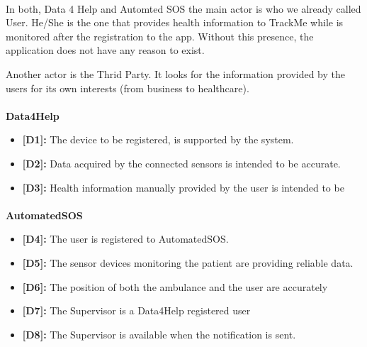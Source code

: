 \paragraph{}
{}

In both, Data 4 Help and Automted SOS the main actor is who we already called User. He/She is the one that provides health information to TrackMe while is monitored after the registration to the app. Without this presence, the application does not have any reason to exist.

Another actor is the Thrid Party. It looks for the information provided by the users for its own interests (from business to healthcare).
\paragraph{}

{}
{}
\paragraph{}
\textbf{Data4Help}
\begin{itemize}
\item \textbf{[D1]:} The device to be registered, is supported by the system.
\item\textbf{[D2]:} Data acquired by the connected sensors is intended to be accurate.
\item \textbf{[D3]:} Health information manually provided by the user is intended to be
\end{itemize}
\paragraph{}
\textbf{AutomatedSOS}
\begin{itemize}
\item\textbf{ [D4]:} The user is registered to AutomatedSOS.
\item \textbf{[D5]:} The sensor devices monitoring the patient are providing reliable data.
\item\textbf{[D6]:} The position of both the ambulance and the user are accurately
\item\textbf{[D7]:} The Supervisor is a Data4Help registered user
\item\textbf{[D8]:} The Supervisor is available when the notification is sent.
\end{itemize}
